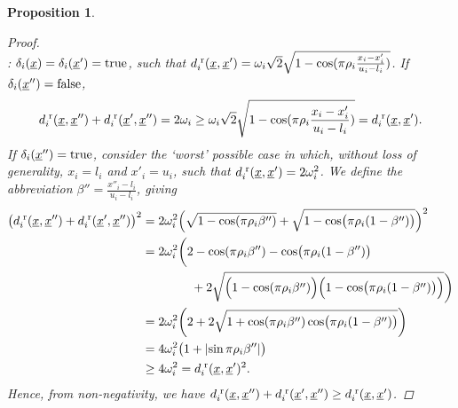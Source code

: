 \documentclass{article}
\newcommand{\vect}[1]{\underline{\smash{#1}}}
\renewcommand{\v}[1]{\vect{#1}}
\newcommand{\br}{^{\text{\textnormal{ r}}}}
\newtheorem{prop}[thm]{Proposition}
\begin{document}
\begin{prop}
\begin{proof}
~\\: $\delta_i(\v{x}) = \delta_i(\v{x}')=\textrm{true}$, such that  $d\br_i(\v{x},\v{x}') = \omega_i \sqrt{2} \sqrt{1 - \cos(\pi\rho_i \frac{x_i-x_i'}{u_i-l_i})}$.  If  $\delta_i(\v{x}'') = \text{false}$,
\begin{align}
d\br_i(\v{x},\v{x}'') + d\br_i(\v{x}',\v{x}'') = 2 \omega_i \geq \omega_i \sqrt{2} \sqrt{1 - \cos(\pi\rho_i \frac{x_i-x_i'}{u_i-l_i})} = d\br_i(\v{x},\v{x}').
\end{align} 
If  $\delta_i(\v{x}'') = \text{true}$, consider the `worst' possible case in which, without loss of generality, $x_i=l_i$ and $x'_i=u_i$, such that $d\br_i(\v{x},\v{x}')=2 \omega_i^2$.  We define the abbreviation $\beta'' = \frac{x''_i-l_i}{u_i-l_i}$, giving
\begin{align}
\bigl(d\br_i(\v{x},\v{x}'') + d\br_i(\v{x}',\v{x}'')\bigr)^2
& = 2\omega_i^2 \Bigl(\sqrt{1 - \cos (\pi\rho_i \beta'')} + \sqrt{1 - \cos \bigl(\pi\rho_i (1-\beta'')\bigr)}\Bigr)^2\nonumber\\
&=2\omega_i^2\biggl(2 - \cos (\pi\rho_i \beta'') - \cos \bigl(\pi\rho_i (1-\beta'')\bigr)
\nonumber\\
&\qquad\qquad+2\sqrt{\Bigl(1 - \cos (\pi\rho_i \beta'')\Bigr)\Bigl(1 - \cos \bigl(\pi\rho_i (1-\beta'')\bigr)\Bigr)}\biggr)\nonumber\\
&=2\omega_i^2\biggl(2 +2\sqrt{1 + \cos (\pi\rho_i \beta'')\cos \bigl(\pi\rho_i (1-\beta'')\bigr)}\biggr)\nonumber\\
&=4 \omega_i^2 \bigl(1 + \left|\sin \pi\rho_i \beta'' \right|\bigr)\nonumber\\
&\geq 4 \omega_i^2 = d\br_i(\v{x},\v{x}')^2.
\end{align}
Hence, from non-negativity, we have $d\br_i(\v{x},\v{x}'') + d\br_i(\v{x}',\v{x}'')\geq d\br_i(\v{x},\v{x}')$.
\end{proof}
\end{prop}
\end{document}
